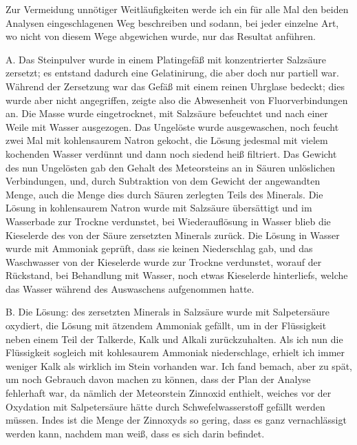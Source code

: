 \documentclass[a4paper, 11pt, oneside]{article}
\begin{document}
Zur Vermeidung unnötiger Weitläufigkeiten werde ich ein für alle Mal den beiden Analysen eingeschlagenen Weg beschreiben und sodann, bei jeder einzelne Art, wo nicht von diesem Wege abgewichen wurde, nur das Resultat anführen.

A. Das Steinpulver wurde in einem Platingefäß mit konzentrierter Salzsäure zersetzt; es entstand dadurch eine Gelatinirung, die aber doch nur partiell war. Während der Zersetzung war das Gefäß mit einem reinen Uhrglase bedeckt; dies wurde aber nicht angegriffen, zeigte also die Abwesenheit von Fluorverbindungen an. Die Masse wurde eingetrocknet, mit Salzsäure befeuchtet und nach einer Weile mit Wasser ausgezogen. Das Ungelöste wurde ausgewaschen, noch feucht zwei Mal mit kohlensaurem Natron gekocht, die Lösung jedesmal mit vielem kochenden Wasser verdünnt und dann noch siedend heiß filtriert. Das Gewicht des nun Ungelösten gab den Gehalt des Meteorsteins an in Säuren unlöslichen Verbindungen, und, durch Subtraktion von dem Gewicht der angewandten Menge, auch die Menge dies durch Säuren zerlegten Teils des Minerals. Die Lösung in kohlensaurem Natron wurde mit Salzsäure übersättigt und im Wasserbade zur Trockne verdunstet, bei Wiederauflösung in Wasser blieb die Kieselerde des von der Säure zersetzten Minerals zurück. Die Lösung in Wasser wurde mit Ammoniak geprüft, dass sie keinen Niederschlag gab, und das Waschwasser von der Kieselerde wurde zur Trockne verdunstet, worauf der Rückstand, bei Behandlung mit Wasser, noch etwas Kieselerde hinterliefs, welche das Wasser während des Auswaschens aufgenommen hatte.

B. Die Lösung: des zersetzten Minerals in Salzsäure wurde mit Salpetersäure oxydiert, die Lösung mit ätzendem Ammoniak gefällt, um in der Flüssigkeit neben einem Teil der Talkerde, Kalk und Alkali zurückzuhalten. Als ich nun die Flüssigkeit sogleich mit kohlesaurem Ammoniak niederschlage, erhielt ich immer weniger Kalk als wirklich im Stein vorhanden war. Ich fand bemach, aber zu spät, um noch Gebrauch davon machen zu können, dass der Plan der Analyse fehlerhaft war, da nämlich der Meteorstein Zinnoxid enthielt, weiches vor der Oxydation mit Salpetersäure hätte durch Schwefelwasserstoff gefällt werden müssen. Indes ist die Menge der Zinnoxyds so gering, dass es ganz vernachlässigt werden kann, nachdem man weiß, dass es sich darin befindet.
\end{document}

